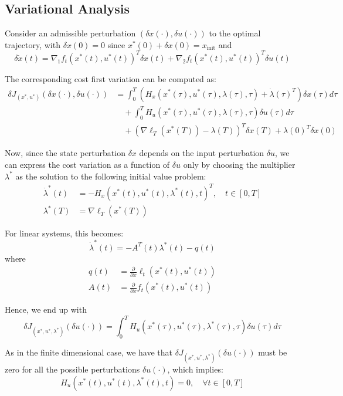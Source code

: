 \documentclass[openany]{book}
\theoremstyle{definition}
\theoremstyle{remark}
\begin{document}
\subsection{Variational Analysis}
Consider an admissible perturbation $(\delta x(\cdot),\delta u(\cdot))$ to the optimal trajectory, with $\delta x(0)=0$ since $x^*(0) + \delta x(0) = x_{\text{init}}$ and
\[
    \delta \dot{x}(t) = \nabla_1f_t(x^*(t),u^*(t))^T\delta x(t) + \nabla_2f_t(x^*(t),u^*(t))^T\delta u(t)
\]

The corresponding cost first variation can be computed as:
\begin{align*}
    \delta J_{(x^*,u^*)}(\delta x(\cdot),\delta u(\cdot)) &= \int_0^T(H_x(x^*(\tau),u^*(\tau),\lambda(\tau),\tau) + \dot{\lambda}(\tau)^T)\delta x(\tau)d\tau\\
    &\quad + \int_0^T H_u(x^*(\tau),u^*(\tau),\lambda(\tau),\tau)\delta u(\tau)d\tau\\
    &\quad + (\nabla\ell_T(x^*(T)) - \lambda(T))^T\delta x(T) + \lambda(0)^T\delta x(0)
\end{align*}

Now, since the state perturbation $\delta x$ depends on the input perturbation $\delta u$, we can express the cost variation as a function of $\delta u$ only by choosing the multiplier $\lambda^*$ as the solution to the following initial value problem:
\begin{align*}
    \dot{\lambda}^*(t) &= -H_x(x^*(t),u^*(t),\lambda^*(t),t)^T, \quad t \in [0,T]\\
    \lambda^*(T) &= \nabla\ell_T(x^*(T))
\end{align*}

For linear systems, this becomes:
\[
    \dot{\lambda}^*(t) = -A^T(t)\lambda^*(t) - q(t)
\]
where
\begin{align*}
    q(t) &= \frac{\partial}{\partial x}\ell_t(x^*(t),u^*(t))\\
    A(t) &= \frac{\partial}{\partial x}f_t(x^*(t),u^*(t))
\end{align*}

Hence, we end up with
\[
    \delta J_{(x^*,u^*,\lambda^*)}(\delta u(\cdot)) = \int_0^T H_u(x^*(\tau),u^*(\tau),\lambda^*(\tau),\tau)\delta u(\tau)d\tau
\]

As in the finite dimensional case, we have that $\delta J_{(x^*,u^*,\lambda^*)}(\delta u(\cdot))$ must be zero for all the possible perturbations $\delta u(\cdot)$, which implies:
\[
    H_u(x^*(t),u^*(t),\lambda^*(t),t) = 0, \quad \forall t \in [0,T]
\]
\end{document}

